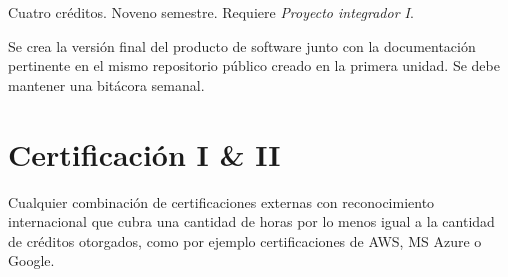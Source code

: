 \documentclass{article}
\begin{document}
Cuatro cr\'{e}ditos. Noveno semestre. Requiere {\em Proyecto integrador I}.

Se crea la versi\'{o}n final del producto de software junto con la
documentaci\'{o}n pertinente en el mismo repositorio p\'{u}blico creado en la
primera unidad. Se debe mantener una bit\'{a}cora semanal.

\hypertarget{cert}{\section*{Certificaci\'{o}n I \& II}} 

Cualquier combinaci\'{o}n de certificaciones externas con reconocimiento
internacional que cubra una cantidad de horas por lo menos igual a la
cantidad de cr\'{e}ditos otorgados, como por ejemplo certificaciones de
AWS, MS Azure o Google.
\end{document}
